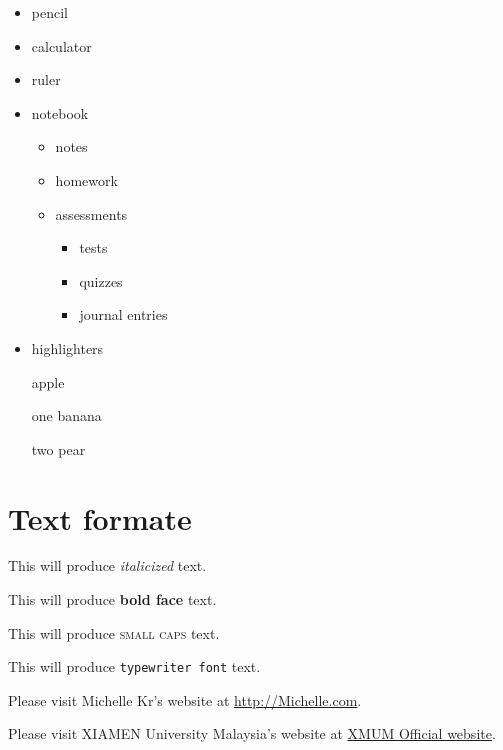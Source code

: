 \documentclass[12pt, a4paper]{article}
\begin{document}
\begin{itemize}
    \item pencil
    \item calculator
    \item ruler
    \item notebook
        \begin{itemize}
            \item notes
            \item homework
            \item assessments
            \begin{itemize}
                \item tests
                \item quizzes
                \item journal entries
            \end{itemize}
        \end{itemize}
    \item highlighters
\end{itemize}

\vspace{1cm}

\begin{enumerate}
    \item []apple
    \item [one]banana
    \item [two]pear
\end{enumerate}

\section{Text formate}

This will produce \textit{italicized} text.

This will produce \textbf{bold face} text.

This will produce \textsc{small caps} text.

This will produce \texttt{typewriter font} text.

Please visit Michelle Kr's website at 
\url{http://Michelle.com}.

Please visit XIAMEN University Malaysia's website at 
\href{https://www.xmu.edu.my/}{XMUM Official website}.

\vspace{2cm}
\end{document}
